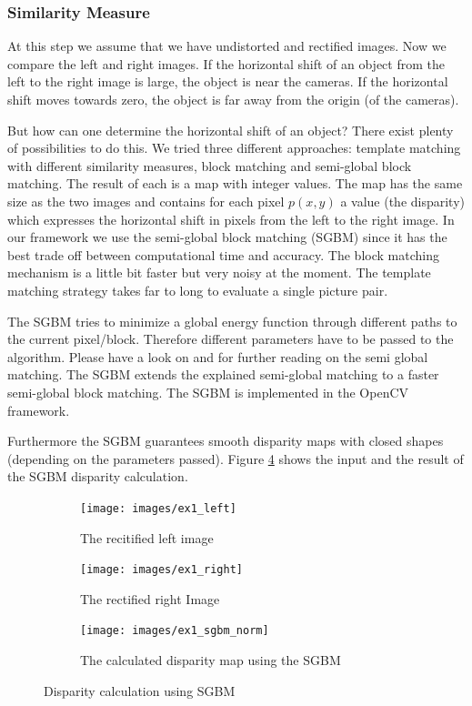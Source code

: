 \documentclass[11pt]{article}
\begin{document}
\subsubsection{Similarity Measure}
At this step we assume that we have undistorted and rectified images. Now we compare the left and right images. If the horizontal shift of an object from the left to the right image is large, the object is near the cameras. If the horizontal shift moves towards zero, the object is far away from the origin (of the cameras).

But how can one determine the horizontal shift of an object? There exist plenty of possibilities to do this. We tried three different approaches: template matching with different similarity measures, block matching and semi-global block matching. The result of each is a map with integer values. The map has the same size as the two images and contains for each pixel $p(x,y)$ a value (the disparity) which expresses the horizontal shift in pixels from the left to the right image. In our framework we use the semi-global block matching (SGBM) since it has the best trade off between computational time and accuracy. The block matching mechanism is a little bit faster but very noisy at the moment. The template matching strategy takes far to long to evaluate a single picture pair. 

The SGBM tries to minimize a global energy function through different paths to the current pixel/block. Therefore different parameters have to be passed to the algorithm. Please have a look on \cite{hirschmuller2005accurate} and \cite{hirschmuller2008stereo} for further reading on the semi global matching. The SGBM extends the explained semi-global matching to a faster semi-global block matching. The SGBM is implemented in the OpenCV framework.

Furthermore the SGBM guarantees smooth disparity maps with closed shapes (depending on the parameters passed). Figure \ref{fig:ex1_sgbm} shows the input and the result of the SGBM disparity calculation.

\begin{figure}[H]
        \centering
        \begin{subfigure}[b]{0.45\textwidth}
                \texttt{[image: images/ex1\_left]}
                \caption{The recitified left image}
                \label{fig:ex1_left}
        \end{subfigure}\hfill  
        \begin{subfigure}[b]{0.45\textwidth}
                \texttt{[image: images/ex1\_right]}
                \caption{The rectified right Image}
                \label{fig:ex1_right}
        \end{subfigure}

        \begin{subfigure}[b]{\textwidth}
                \texttt{[image: images/ex1\_sgbm\_norm]}
                \caption{The calculated disparity map using the SGBM}
                \label{fig:ex1_sgbm_norm}
        \end{subfigure}
        \caption{Disparity calculation using SGBM}\label{fig:ex1_sgbm}
\end{figure}
\end{document}
